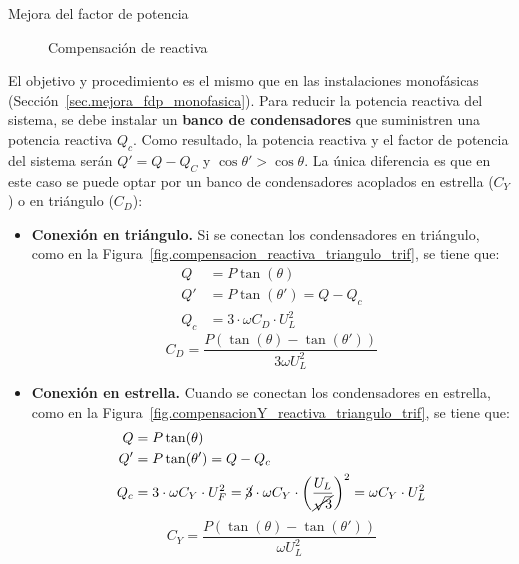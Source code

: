 \documentclass[11pt]{book} %
\makeatletter
\numberwithin{dummy}{section}
\theoremstyle{ocrenumbox}
\theoremstyle{blacknumex}
\theoremstyle{blacknumbox}
\theoremstyle{ocrenum}
\renewcommand{\section}{\@startsection{section}{1}{\z@}
{-4ex \@plus -1ex \@minus -.4ex}
{1ex \@plus.2ex }
{\normalfont\large\sffamily\bfseries}}
\makeatother
\begin{document}
		\section{Mejora del factor de potencia}
		\begin{figure}
		    \centering
		    \hfill
		    \caption{Compensación de reactiva}
		\end{figure}
		El objetivo y procedimiento es el mismo que en las instalaciones monofásicas (Sección~\ref{sec.mejora_fdp_monofasica}). Para reducir la potencia reactiva del sistema, se debe instalar un \textbf{banco de condensadores} que suministren una potencia reactiva $Q_c$. Como resultado, la potencia reactiva y el factor de potencia del sistema serán $Q' = Q - Q_C$ y $\cos\theta' > \cos \theta$. La única diferencia es que en este caso se puede optar por un banco de condensadores acoplados en estrella ($C_Y$) o en triángulo ($C_D$):
		\begin{itemize}
		    \item \textbf{Conexión en triángulo.} Si se conectan los condensadores en triángulo, como en la Figura~\ref{fig.compensacion_reactiva_triangulo_trif}, se tiene que: 
		\begin{align*}
          Q &= P\tan(\theta)\\
          Q' &= P\tan(\theta') = Q - Q_c\\
          Q_c &= 3 \cdot \omega C_D \cdot U_L^2
        \end{align*}
        \begin{equation}
            \boxed{C_D = \frac{P(\tan (\theta) - \tan (\theta'))}{3\omega U_L^2}}
        \end{equation}
		    \item \textbf{Conexión en estrella.} Cuando se conectan los condensadores en estrella, como en la Figura~\ref{fig.compensacionY_reactiva_triangulo_trif}, se tiene que: 
		\begin{align*}
          Q &= P\tan(\theta)\\
          Q' &= P\tan(\theta') = Q - Q_c\\
          Q_c &= 3 \cdot \omega C_Y \cdot U_F^2 = \cancel{3} \cdot \omega C_Y \cdot \left(\dfrac{U_L}{\cancel{\sqrt{3}}}\right)^2=\omega C_Y \cdot U_L^2
        \end{align*}
        \begin{equation}
            \boxed{C_Y = \frac{P(\tan (\theta) - \tan (\theta'))}{\omega U_L^2}}
        \end{equation}
		\end{itemize}
		
\end{document}
